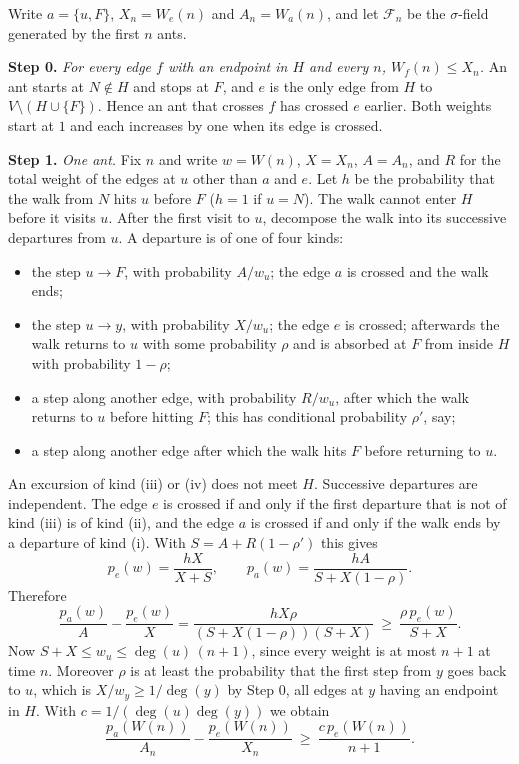 \documentclass[11pt]{amsart}
\theoremstyle{remark}
\newcommand{\cF}{\mathcal{F}}
\begin{document}
Write $a=\{u,F\}$, $X_n=W_e(n)$ and $A_n=W_a(n)$, and let $\cF_n$ be the $\sigma$-field generated by the first $n$
ants.

\medskip\noindent\textbf{Step 0.} \emph{For every edge $f$ with an endpoint in $H$ and every $n$, $W_f(n)\le X_n$.}
An ant starts at $N\notin H$ and stops at $F$, and $e$ is the only edge from $H$ to $V\setminus(H\cup\{F\})$. Hence an
ant that crosses $f$ has crossed $e$ earlier. Both weights start at $1$ and each increases by one when its edge is
crossed.

\medskip\noindent\textbf{Step 1.} \emph{One ant.} Fix $n$ and write $w=W(n)$, $X=X_n$, $A=A_n$, and $R$ for the
total weight of the edges at $u$ other than $a$ and $e$. Let $h$ be the probability that the walk from $N$ hits $u$
before $F$ ($h=1$ if $u=N$). The walk cannot enter $H$ before it visits $u$. After the first visit to $u$, decompose
the walk into its successive departures from $u$. A departure is of one of four kinds:
\begin{itemize}
\item[(i)] the step $u\to F$, with probability $A/w_u$; the edge $a$ is crossed and the walk ends;
\item[(ii)] the step $u\to y$, with probability $X/w_u$; the edge $e$ is crossed; afterwards the walk returns to $u$
with some probability $\rho$ and is absorbed at $F$ from inside $H$ with probability $1-\rho$;
\item[(iii)] a step along another edge, with probability $R/w_u$, after which the walk returns to $u$ before hitting
$F$; this has conditional probability $\rho'$, say;
\item[(iv)] a step along another edge after which the walk hits $F$ before returning to $u$.
\end{itemize}
An excursion of kind (iii) or (iv) does not meet $H$. Successive departures are independent. The edge $e$ is crossed
if and only if the first departure that is not of kind (iii) is of kind (ii), and the edge $a$ is crossed if and only
if the walk ends by a departure of kind (i). With $S=A+R(1-\rho')$ this gives
\begin{equation}\label{eq:pe}
p_e(w)=\frac{hX}{X+S},\qquad p_a(w)=\frac{hA}{S+X(1-\rho)} .
\end{equation}
Therefore
\begin{equation}\label{eq:diff}
\frac{p_a(w)}{A}-\frac{p_e(w)}{X}=\frac{hX\rho}{(S+X(1-\rho))(S+X)}\ \ge\ \frac{\rho\,p_e(w)}{S+X}.
\end{equation}
Now $S+X\le w_u\le\deg(u)\,(n+1)$, since every weight is at most $n+1$ at time $n$. Moreover $\rho$ is at least the
probability that the first step from $y$ goes back to $u$, which is $X/w_y\ge1/\deg(y)$ by Step 0, all edges at $y$
having an endpoint in $H$. With $c=1/(\deg(u)\deg(y))$ we obtain
\begin{equation}\label{eq:drift}
\frac{p_a(W(n))}{A_n}-\frac{p_e(W(n))}{X_n}\ \ge\ \frac{c\,p_e(W(n))}{n+1}.
\end{equation}
\end{document}
